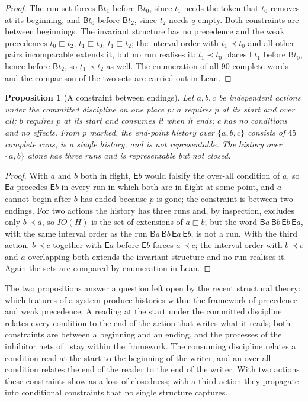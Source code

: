 \documentclass[preprint,12pt]{elsarticle}
\theoremstyle{plain}
\newtheorem{proposition}[theorem]{Proposition}
\theoremstyle{definition}
\newcommand{\B}[1]{\mathsf{B}#1}
\newcommand{\E}[1]{\mathsf{E}#1}
\newcommand{\wprec}{\sqsubset}
\newcommand{\IO}{\mathit{IO}}
\begin{document}
\begin{proof}
The run set forces $\B{t_1}$ before $\B{t_0}$, since $t_1$ needs the token that $t_0$ removes at its beginning, and $\B{t_0}$ before $\B{t_2}$, since $t_2$ needs $q$ empty. Both constraints are between beginnings. The invariant structure has no precedence and the weak precedences $t_0 \wprec t_2$, $t_1 \wprec t_0$, $t_1 \wprec t_2$; the interval order with $t_1 \prec t_0$ and all other pairs incomparable extends it, but no run realises it: $t_1 \prec t_0$ places $\E{t_1}$ before $\B{t_0}$, hence before $\B{t_2}$, so $t_1 \prec t_2$ as well. The enumeration of all $90$ complete words and the comparison of the two sets are carried out in Lean.
\end{proof}

\begin{proposition}[A constraint between endings]
\label{prop:endend}
Let $a, b, c$ be independent actions under the committed discipline on one place $p$: $a$ requires $p$ at its start and over all; $b$ requires $p$ at its start and consumes it when it ends; $c$ has no conditions and no effects. From $p$ marked, the end-point history over $\{a, b, c\}$ consists of $45$ complete runs, is a single history, and is not representable. The history over $\{a, b\}$ alone has three runs and is representable but not closed.
\end{proposition}

\begin{proof}
With $a$ and $b$ both in flight, $\E{b}$ would falsify the over-all condition of $a$, so $\E{a}$ precedes $\E{b}$ in every run in which both are in flight at some point, and $a$ cannot begin after $b$ has ended because $p$ is gone; the constraint is between two endings. For two actions the history has three runs and, by inspection, excludes only $b \prec a$, so $\IO(H)$ is the set of extensions of $a \wprec b$; but the word $\B{a}\,\B{b}\,\E{b}\,\E{a}$, with the same interval order as the run $\B{a}\,\B{b}\,\E{a}\,\E{b}$, is not a run. With the third action, $b \prec c$ together with $\E{a}$ before $\E{b}$ forces $a \prec c$; the interval order with $b \prec c$ and $a$ overlapping both extends the invariant structure and no run realises it. Again the sets are compared by enumeration in Lean.
\end{proof}

The two propositions answer a question left open by the recent structural theory: which features of a system produce histories within the framework of precedence and weak precedence. A reading at the start under the committed discipline relates every condition to the end of the action that writes what it reads; both constraints are between a beginning and an ending, and the processes of the inhibitor nets of~\cite{AlqarniJanicki2018} stay within the framework. The consuming discipline relates a condition read at the start to the beginning of the writer, and an over-all condition relates the end of the reader to the end of the writer. With two actions these constraints show as a loss of closedness; with a third action they propagate into conditional constraints that no single structure captures.
\end{document}
